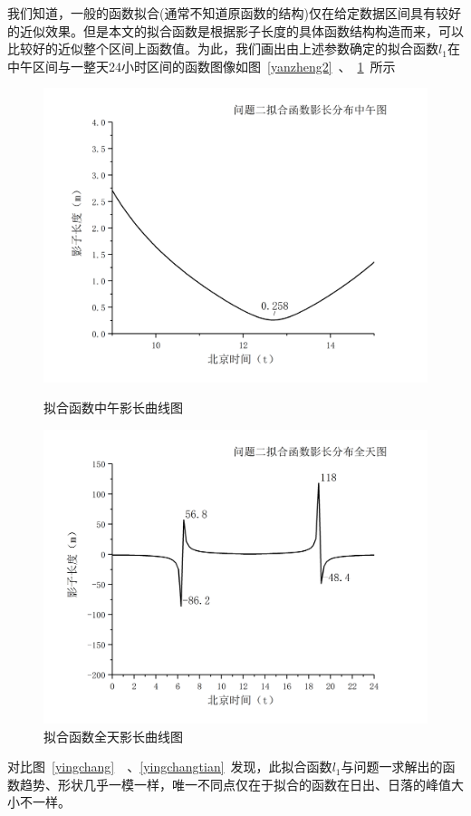 \documentclass[12pt]{cumcmart}   %
\begin{document}
我们知道，一般的函数拟合(通常不知道原函数的结构)仅在给定数据区间具有较好的近似效果。但是本文的拟合函数是根据影子长度的具体函数结构构造而来，可以比较好的近似整个区间上函数值。为此，我们画出由上述参数确定的拟合函数$l_1$在中午区间与一整天24小时区间的函数图像如图~\ref{yanzheng2}~、~\ref{yanzheng1}~所示
\begin{figure}[h]
	\centering
	\begin{minipage}{.45\textwidth}
		\centering
		\includegraphics[width=.95\textwidth]{images/yanzheng2.png}
		\caption{拟合函数中午影长曲线图}
		\label{yanzheng2}
	\end{minipage}\hfill
	\begin{minipage}{.45\textwidth}
		\centering
		\includegraphics[width=.95\textwidth]{images/yanzheng1.png}
		\caption{拟合函数全天影长曲线图}
		\label{yanzheng1}
	\end{minipage}	
\end{figure}
对比图~\ref{yingchang}~~、\ref{yingchangtian}~发现，此拟合函数$l_1$与问题一求解出的函数趋势、形状几乎一模一样，唯一不同点仅在于拟合的函数在日出、日落的峰值大小不一样。
\end{document}
